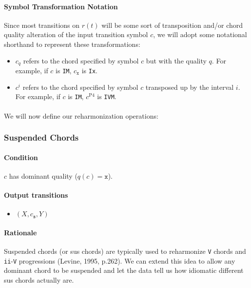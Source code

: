 \documentclass[]{article}
\begin{document}
\paragraph{Symbol Transformation Notation} Since most transitions on $r(t)$ will be some sort of transposition and/or chord quality alteration of the input transition symbol $c$, we will adopt some notational shorthand to represent these transformations:
\begin{itemize}
	\item $c_q$ refers to the chord specified by symbol $c$ but with the quality $q$.  For example, if $c$ is \texttt{IM}, $c_\texttt{x}$ is \texttt{Ix}.
	\item $c^i$ refers to the chord specified by symbol $c$ transposed up by the interval $i$.  For example, if $c$ is \texttt{IM}, $c^\textrm{P4}$ is \texttt{IVM}.
\end{itemize}

\paragraph{} We will now define our reharmonization operations:

\subsubsection{Suspended Chords}
\paragraph{Condition} $c$ has dominant quality ($q(c) = \texttt{x}$).

\paragraph{Output transitions}
\begin{itemize}
	\item $(X, c_\texttt{s}, Y)$
\end{itemize}

\paragraph{Rationale} Suspended chords (or sus chords) are typically used to reharmonize \texttt{V} chords and \texttt{ii}-\texttt{V} progressions (Levine, 1995, p.262).  We can extend this idea to allow any dominant chord to be suspended and let the data tell us how idiomatic different sus chords actually are.
\end{document}
